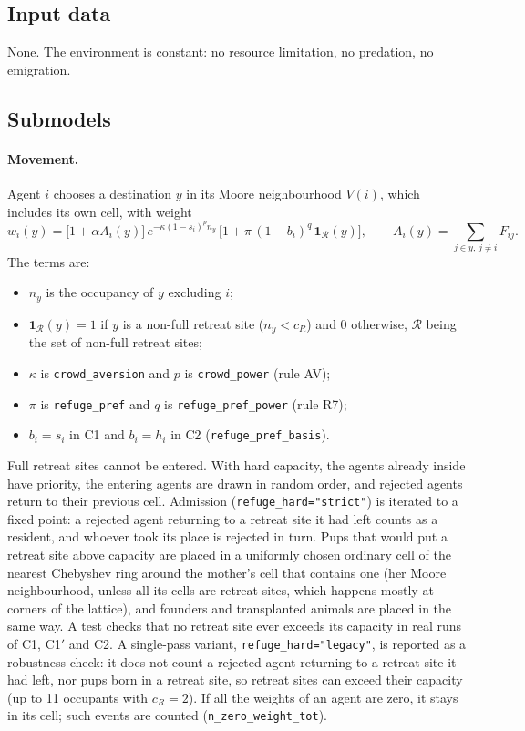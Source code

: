 \documentclass[preprint,12pt,authoryear]{elsarticle}
\begin{document}
\subsection*{Input data}
None. The environment is constant: no resource limitation, no predation, no emigration.

\subsection*{Submodels}
\paragraph{Movement.}
Agent $i$ chooses a destination $y$ in its Moore neighbourhood $V(i)$, which includes its own cell, with weight
\[
w_i(y)=\bigl[1+\alpha A_i(y)\bigr]\,
e^{-\kappa(1-s_i)^{p}n_y}\,
\bigl[1+\pi\,(1-b_i)^{q}\,\mathbf 1_{\mathcal R}(y)\bigr],
\qquad A_i(y)=\sum_{j\in y,\,j\ne i}F_{ij}.
\]
The terms are:
\begin{itemize}
\item $n_y$ is the occupancy of $y$ excluding $i$;
\item $\mathbf 1_{\mathcal R}(y)=1$ if $y$ is a non-full retreat site ($n_y<c_R$) and 0 otherwise, $\mathcal R$ being the set of
  non-full retreat sites;
\item $\kappa$ is \texttt{crowd\_aversion} and $p$ is \texttt{crowd\_power} (rule AV);
\item $\pi$ is \texttt{refuge\_pref} and $q$ is \texttt{refuge\_pref\_power} (rule R7);
\item $b_i=s_i$ in \textsf{C1} and $b_i=h_i$ in \textsf{C2} (\texttt{refuge\_pref\_basis}).
\end{itemize}
Full retreat sites cannot be entered. With hard capacity, the agents already inside have priority, the entering agents are
drawn in random order, and rejected agents return to their previous cell. Admission (\texttt{refuge\_hard="strict"}) is iterated to a fixed
point: a rejected agent returning to a retreat site it had left counts as a resident, and whoever took its place is
rejected in turn. Pups that would put a retreat site
above capacity are placed in a uniformly chosen ordinary cell of the nearest Chebyshev ring around the mother's
cell that contains one (her Moore neighbourhood, unless all its cells are retreat sites, which happens mostly at corners of
the lattice), and founders and transplanted animals are placed in the same way. A test checks that no retreat site ever exceeds its capacity in real
runs of \textsf{C1}, \textsf{C1}$'$ and \textsf{C2}. A single-pass variant, \texttt{refuge\_hard="legacy"}, is
reported as a robustness check: it does not count a rejected agent returning to a retreat site it had left, nor pups born in
a retreat site, so retreat sites can exceed their capacity (up to 11 occupants with $c_R=2$). If all the weights of an agent are zero, it stays in its cell; such events are
counted (\texttt{n\_zero\_weight\_tot}).
\end{document}
